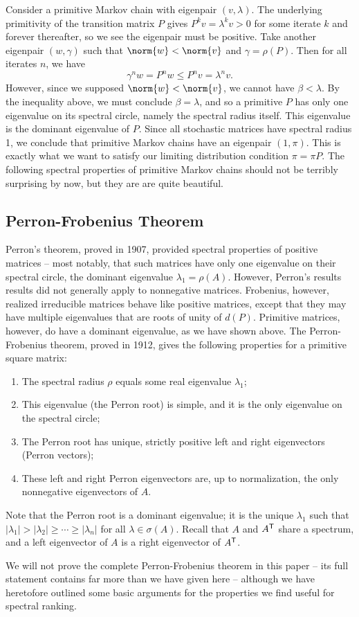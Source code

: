 \documentclass[../exploring-pagerank.tex]{subfiles}
\begin{document}
    Consider a primitive Markov chain with eigenpair $(v, \lambda)$. The underlying primitivity of the transition matrix $P$ gives $P^k v = \lambda^k v > 0$ for some iterate $k$ and forever thereafter, so we see the eigenpair must be positive. Take another eigenpair $(w, \gamma)$ such that $\norm{w} < \norm{v}$ and $\gamma = \rho(P)$. Then for all iterates $n$, we have
    \begin{equation*}
        \gamma^n w = P^n w \leq P^n v = \lambda^n v.
    \end{equation*}
    However, since we supposed $\norm{w} < \norm{v}$, we cannot have $\beta < \lambda$. By the inequality above, we must conclude $\beta = \lambda$, and so a primitive $P$ has only one eigenvalue on its spectral circle, namely the spectral radius itself. This eigenvalue is the dominant eigenvalue of $P$. Since all stochastic matrices have spectral radius 1, we conclude that primitive Markov chains have an eigenpair $(1, \pi)$. This is exactly what we want to satisfy our limiting distribution condition $\pi = \pi P$. The following spectral properties of primitive Markov chains should not be terribly surprising by now, but they are are quite beautiful.

	\subsection{Perron-Frobenius Theorem}
	Perron's theorem, proved in 1907, provided spectral properties of positive matrices -- most notably, that such matrices have only one eigenvalue on their spectral circle, the dominant eigenvalue $\lambda_1=\rho(A)$. However, Perron's results results did not generally apply to nonnegative matrices. Frobenius, however, realized irreducible matrices behave like positive matrices, except that they may have multiple eigenvalues that are roots of unity of $d(P)$. Primitive matrices, however, do have a dominant eigenvalue, as we have shown above. The Perron-Frobenius theorem, proved in 1912, gives the following properties for a primitive square matrix:
	\begin{enumerate}
		\item The spectral radius $\rho$ equals some real eigenvalue $\lambda_1$;
		\item This eigenvalue (the Perron root) is simple, and it is the only eigenvalue on the spectral circle;
		\item The Perron root has unique, strictly positive left and right eigenvectors (Perron vectors);
		\item These left and right Perron eigenvectors are, up to normalization, the only nonnegative eigenvectors of $A$.
	\end{enumerate}
	Note that the Perron root is a dominant eigenvalue; it is the unique $\lambda_1$ such that $|\lambda_1|>|\lambda_2|\geq\cdots\geq |\lambda_{n}|$ for all $\lambda \in \sigma(A)$. Recall that $A$ and $A^{\mathsf{T}}$ share a spectrum, and a left eigenvector of $A$ is a right eigenvector of $A^{\mathsf{T}}$.

	We will not prove the complete Perron-Frobenius theorem in this paper -- its full statement contains far more than we have given here -- although we have heretofore outlined some basic arguments for the properties we find useful for spectral ranking.
\end{document}
